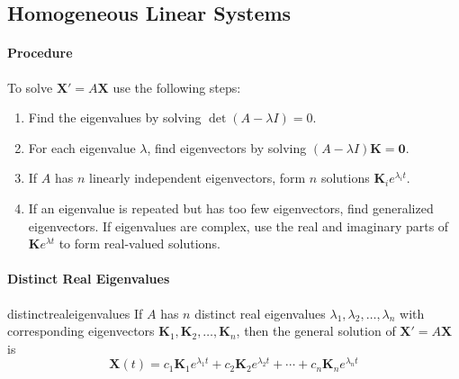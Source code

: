 \documentclass[oneside]{book}
\begin{document}


\subsection{Homogeneous Linear Systems}

\paragraph{Procedure} To solve $\mathbf{X}'=A\mathbf{X}$ use the following steps:
\begin{enumerate}
    \item Find the eigenvalues by solving $\det(A-\lambda I)=0$. 
    \item For each eigenvalue $\lambda$, find eigenvectors by solving $ (A-\lambda I)\mathbf{K}=\mathbf{0}$.
    \item If $A$ has $n$ linearly independent eigenvectors, form $n$ solutions $\mathbf{K}_i e^{\lambda_i t}$.
    \item If an eigenvalue is repeated but has too few eigenvectors, find
    generalized eigenvectors. If eigenvalues are complex, use the real and imaginary parts of
    $\mathbf{K}e^{\lambda t}$ to form real-valued solutions.
\end{enumerate}

\paragraph{Distinct Real Eigenvalues}{distinctrealeigenvalues}{
    If $A$ has $n$ distinct real eigenvalues $\lambda_1,\lambda_2,\ldots,\lambda_n$ with corresponding eigenvectors $\mathbf{K}_1,\mathbf{K}_2,\ldots,\mathbf{K}_n$, then the general solution of $ \mathbf{X}'=A\mathbf{X}$ is
    \[
        \mathbf{X}(t)
        =
        c_1\mathbf{K}_1e^{\lambda_1 t}
        +
        c_2\mathbf{K}_2e^{\lambda_2 t}
        +\cdots+
        c_n\mathbf{K}_ne^{\lambda_n t}
    \]
}
\end{document}
